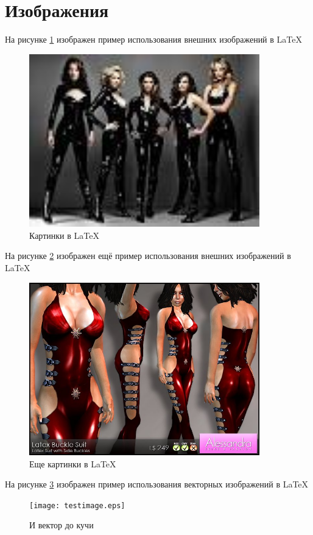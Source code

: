 \section{Изображения}
На рисунке \ref{f:1} изображен пример использования внешних изображений в LaTeX

\begin{figure}[h]
\centering
\includegraphics[width=100mm]{testimage.jpg}

\caption{Картинки в LaTeX}
\label{f:1}
\end{figure}
На рисунке \ref{f:2} изображен ещё пример использования внешних изображений в LaTeX
\begin{figure}[h!]
\centering
\includegraphics[width=100mm]{testimage2.png}

\caption{Еще картинки в LaTeX}
\label{f:2}
\end{figure}

На рисунке \ref{f:3} изображен пример использования векторных изображений в LaTeX
\begin{figure}[h!]
\centering
\texttt{[image: testimage.eps]}
 
\caption{И вектор до кучи}
\label{f:3}
\end{figure}